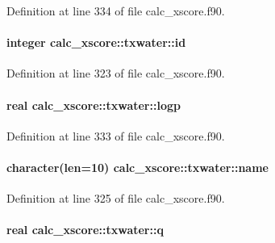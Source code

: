 Definition at line 334 of file calc\-\_\-xscore.\-f90.

\hypertarget{structcalc__xscore_1_1txwater_a97ff68e4d1414e0113cf3355b7b8f2d4}{
\paragraph[{id}]{\setlength{\rightskip}{0pt plus 5cm}integer calc\-\_\-xscore\-::txwater\-::id}}\label{structcalc__xscore_1_1txwater_a97ff68e4d1414e0113cf3355b7b8f2d4}


Definition at line 323 of file calc\-\_\-xscore.\-f90.

\hypertarget{structcalc__xscore_1_1txwater_aaaea5df5eb83bdf62adf6f74a454fdf6}{
\paragraph[{logp}]{\setlength{\rightskip}{0pt plus 5cm}real calc\-\_\-xscore\-::txwater\-::logp}}\label{structcalc__xscore_1_1txwater_aaaea5df5eb83bdf62adf6f74a454fdf6}


Definition at line 333 of file calc\-\_\-xscore.\-f90.

\hypertarget{structcalc__xscore_1_1txwater_a4a6c959d358f4d21ab1aea77b9ec8edd}{
\paragraph[{name}]{\setlength{\rightskip}{0pt plus 5cm}character(len=10) calc\-\_\-xscore\-::txwater\-::name}}\label{structcalc__xscore_1_1txwater_a4a6c959d358f4d21ab1aea77b9ec8edd}


Definition at line 325 of file calc\-\_\-xscore.\-f90.

\hypertarget{structcalc__xscore_1_1txwater_a0fc4d5652e7f2ccd36c935f14638ae08}{
\paragraph[{q}]{\setlength{\rightskip}{0pt plus 5cm}real calc\-\_\-xscore\-::txwater\-::q}}\label{structcalc__xscore_1_1txwater_a0fc4d5652e7f2ccd36c935f14638ae08}


